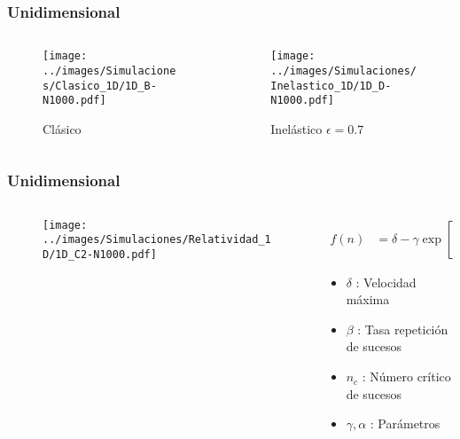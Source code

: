 \documentclass{beamer}
\begin{document}
\begin{frame}[t]
    \frametitle[prueb1]{Unidimensional}
    \begin{columns}
        \hspace{-0.7cm}
        \begin{column}{0.5\textwidth}
            \begin{figure}
                \centering
                \texttt{[image: ../images/Simulaciones/Clasico\_1D/1D\_B-N1000.pdf]}
                \caption{Clásico}
            \end{figure}         
        \end{column}
        \begin{column}{0.5\textwidth}
            \begin{figure}
                \centering 
                \texttt{[image: ../images/Simulaciones/Inelastico\_1D/1D\_D-N1000.pdf]}
                \caption{Inelástico \( \epsilon = 0.7 \)}
            \end{figure}
        \end{column}
    \end{columns}
\end{frame}

\begin{frame}[t]
    \frametitle[prueb1]{Unidimensional}
    \begin{columns}
        \hspace{-0.7cm}
        \begin{column}{0.5\textwidth}
            \begin{figure}
                \centering
                \texttt{[image: ../images/Simulaciones/Relatividad\_1D/1D\_C2-N1000.pdf]}
            \end{figure}         
        \end{column}
        \begin{column}{0.5\textwidth}
            \begin{align*}
                f(n) &= \delta - \gamma \exp\left[ -\beta \left( \dfrac{n}{n_c} \right)^\alpha \right]
            \end{align*}
            \begin{itemize}
                \item \( \delta \) : Velocidad máxima 
                \item \( \beta \) : Tasa repetición de sucesos
                \item \( n_c \) : Número crítico de sucesos
                \item \( \gamma, \alpha \) : Parámetros
            \end{itemize}
        \end{column}
    \end{columns}
\end{frame}
\end{document}

